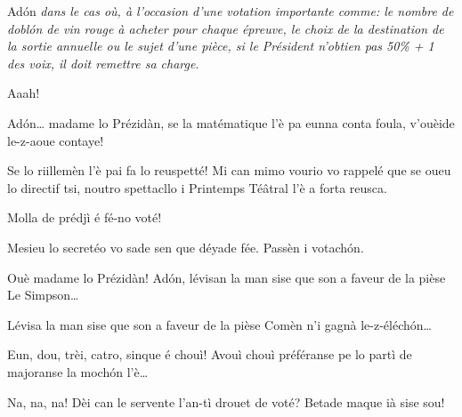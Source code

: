 \begin{drama}
\Secreteospeaks Ad\'on \og\textit{dans le cas où, à l’occasion d’une votation importante comme: le nombre de \og dobl\'on \fg de vin rouge à acheter pour chaque épreuve, le choix de la destination de la sortie annuelle ou le sujet d’une pièce, si le Président n’obtien pas 50\% + 1 des voix, il doit remettre sa charge}\fg.

\Sophiespeaks Aaah! 


\Jordyspeaks Ad\'on\ldots {}  madame lo Prézidàn, se la matématique l'è pa eunna conta foula, v'ouèide le-z-aoue contaye!

\Presidanspeaks {} Se lo riillemèn l'è pai fa lo reuspetté! Mi can mimo vourio vo rappelé que se oueu lo directif tsi, noutro spettacllo i Printemps Té\^atral l'è a forta reusca.

\Marcospeaks Molla de prédjì é fé-no voté!

\Presidanspeaks Mesieu lo secretéo vo sade sen que déyade fée. Passèn i votach\'on.

\Secreteospeaks Ouè madame lo Prézidàn! Ad\'on, lévisan la man sise que son a faveur de la pièse \og Le Simpson\fg\ldots


\Secreteospeaks Lévisa la man sise que son a faveur de la pièse \og Comèn n'i gagnà le-z-éléch\'on\fg\ldots


\Secreteospeaks Eun, dou, trèi, catro, sinque  é chouì! Avouì chouì préféranse pe lo partì de majoranse la moch\'on l’è\ldots

\Sophiespeaks {}
Na, na, na! Dèi can le servente l'an-tì drouet de
voté?  Betade maque ià sise sou!


\end{drama}
